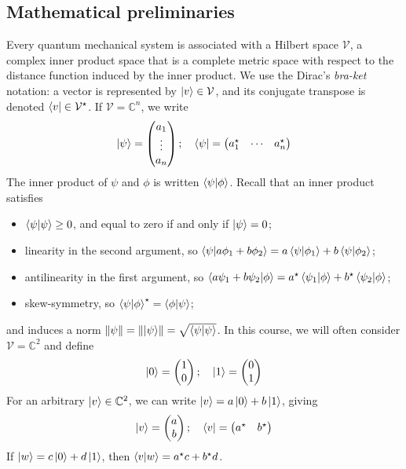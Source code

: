 \subsection{Mathematical preliminaries}
Every quantum mechanical system is associated with a Hilbert space \( \mathcal V \), a complex inner product space that is a complete metric space with respect to the distance function induced by the inner product.
We use the Dirac's \emph{bra-ket} notation: a vector is represented by \( \ket{v} \in \mathcal V \), and its conjugate transpose is denoted \( \bra{v} \in \mathcal V^\star \).
If \( \mathcal V = \mathbb C^n \), we write
\[ \ket{\psi} = \begin{pmatrix}
    a_1 \\
    \vdots \\
    a_n
\end{pmatrix};\quad \bra{\psi} = \begin{pmatrix}
    a_1^\star & \cdots & a_n^\star
\end{pmatrix} \]
The inner product of \( \psi \) and \( \phi \) is written \( \bra{\psi}\ket{\phi} \).
Recall that an inner product satisfies
\begin{itemize}
    \item \( \bra{\psi}\ket{\psi} \geq 0 \), and equal to zero if and only if \( \ket{\psi} = 0 \);
    \item linearity in the second argument, so \( \bra{\psi}\ket{a\phi_1 + b\phi_2} = a \bra{\psi}\ket{\phi_1} + b \bra{\psi}\ket{\phi_2} \);
    \item antilinearity in the first argument, so \( \bra{a\psi_1 + b\psi_2}\ket{\phi} = a^\star \bra{\psi_1}\ket{\phi} + b^\star \bra{\psi_2}\ket{\phi} \);
    \item skew-symmetry, so \( \bra{\psi}\ket{\phi}^\star = \bra{\phi}\ket{\psi} \);
\end{itemize}
and induces a norm \( \norm{\psi} = \norm{\ket{\psi}} = \sqrt{\bra{\psi}\ket{\psi}} \).
In this course, we will often consider \( \mathcal V = \mathbb C^2 \) and define
\[ \ket{0} = \begin{pmatrix}
    1 \\ 0
\end{pmatrix};\quad \ket{1} = \begin{pmatrix}
    0 \\ 1
\end{pmatrix} \]
For an arbitrary \( \ket{v} \in \mathbb C^2 \), we can write \( \ket{v} = a \ket{0} + b \ket{1} \), giving
\[ \ket{v} = \begin{pmatrix}
    a \\ b
\end{pmatrix};\quad \bra{v} = \begin{pmatrix}
    a^\star & b^\star
\end{pmatrix} \]
If \( \ket{w} = c \ket{0} + d \ket{1} \), then \( \ip{v}{w} = a^\star c + b^\star d \).

